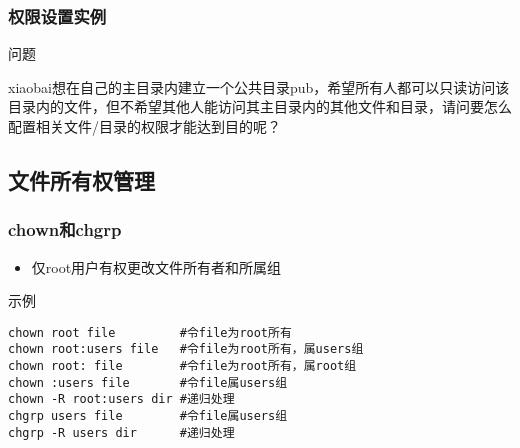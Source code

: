 \documentclass[xcolor=svgnames,presentation]{beamer}
\begin{document}
\begin{frame}[fragile]
\frametitle{权限设置实例}
\label{sec-2-1-5}
\begin{block}{问题}
\label{sec-2-1-5-1}

xiaobai想在自己的主目录内建立一个公共目录pub，希望所有人都可以只读访问该目录内的文件，但不希望其他人能访问其主目录内的其他文件和目录，请问要怎么配置相关文件/目录的权限才能达到目的呢？
\end{block}
\end{frame}
\subsection{文件所有权管理}
\label{sec-2-2}
\begin{frame}[fragile]
\frametitle{chown和chgrp}
\label{sec-2-2-1}
\begin{itemize}

\item 仅root用户有权更改文件所有者和所属组
\label{sec-2-2-1-1}%
\end{itemize} %
\begin{exampleblock}{示例}
\label{sec-2-2-1-2}


\begin{verbatim}
chown root file         #令file为root所有
chown root:users file   #令file为root所有，属users组
chown root: file        #令file为root所有，属root组
chown :users file       #令file属users组
chown -R root:users dir #递归处理
chgrp users file        #令file属users组
chgrp -R users dir      #递归处理
\end{verbatim}
\end{exampleblock}
\end{frame}
\end{document}
